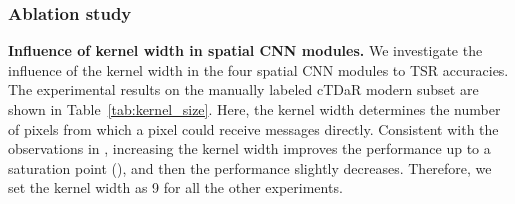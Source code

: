 \documentclass[final,3p,times,twocolumn]{elsarticle}
\begin{document}
\subsubsection{Ablation study}
\textbf{Influence of kernel width in spatial CNN modules.} We investigate the influence of the kernel width in the four spatial CNN modules to TSR accuracies. The experimental results on the manually labeled cTDaR modern subset are shown in Table~\ref{tab:kernel_size}. Here, the kernel width determines the number of pixels from which a pixel could receive messages directly. Consistent with the observations in \cite{pan2018spatial}, increasing the kernel width improves the performance up to a saturation point (), and then the performance slightly decreases. Therefore, we set the kernel width as 9 for all the other experiments.
\end{document}
